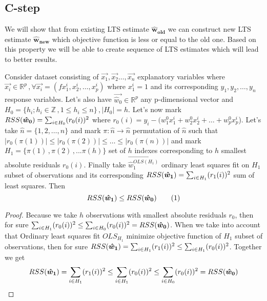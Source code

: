 
\subsection{C-step}
We will show that from existing LTS estimate $\boldsymbol{\hat{w}_{old}}$ we 
can construct new LTS estimate $\boldsymbol{\hat{w}_{new}}$ which objective 
function is less or equal to the old one. Based on this property we will be able 
to create sequence of LTS estimates which will lead to better results.




\begin{theorem}
Consider dataset consisting of
$\vec{x_1}, \vec{x_2} \ldots,\vec{x_n}$ explanatory variables where 
$\vec{x_i}\in\mathbb{R}^p\,, \forall \vec{x_i} = (fx^i_1, x^i_2,\ldots,x^i_p)$ where $x^i_1 = 1$
and its corresponding $y_1, y_2,\ldots,y_n$ response variables. 
Let's also have $\vec{\hat{w}_0}\in\mathbb{R}^p$ any p-dimensional vector and 
$H_0 = \{{h_i ; h_i \in\mathbb{Z}\,, 1 \leq h_i \leq n\}}\,, |H_0| = h$. 
Let's now mark $RSS(\boldsymbol{\hat{w}_0}) = \sum_{i\in H_0} (r_0(i))^2$ where 
$r_0(i) = y_i - (w_1^0x^i_1 + w_2^0x^i_2 +\ldots+ w_p^0x^i_p$).
Let's take $\hat{n} = \{{1,2,\ldots,n\}}$ and mark
$\pi: \hat{n} \rightarrow \hat{n}$ permutation of $\hat{n}$ such that $|r_0({\pi(1)})| \leq |r_0({\pi(2)})| \leq \ldots \leq |r_0({\pi(n)})|$
and mark $H_1 = \{{\pi(1)\,, \pi(2)\,,... \pi(h)\}}$ set of $h$ indexes corresponding to $h$ smallest absolute residuals $r_0(i)$.
Finally take $\vec{\hat{w}^{OLS(H_1)}_1 }$ ordinary least squares fit on $H_1$ subset of observations
and its corresponding $RSS(\boldsymbol{\hat{w}_1}) = \sum_{i\in H_1} (r_1(i))^2$ sum of least squares. Then
\[ 
	RSS(\what{1}) \leq RSS(\what{0}) \numberthis
\]
\end{theorem}

\begin{proof}
	Because we take $h$ observations with smallest absolute residuals $r_0$, then for sure $\sum_{i\in H_1} (r_0(i))^2 \leq \sum_{i\in H_0} (r_0(i))^2 =  RSS(\boldsymbol{\hat{w}_0})$.
	When we take into account that Ordinary least squares fit $OLS_{H_1}$ minimize objective function of 
	$H_1$ subset of observations, then for sure  $RSS(\boldsymbol{\hat{w}_1}) =  \sum_{i\in H_1} (r_1(i))^2 \leq \sum_{i\in H_1} (r_0(i))^2$.
	Together we get $$RSS(\boldsymbol{\hat{w}_1})=\sum_{i\in H_1}(r_1(i))^2\leq\sum_{i\in H_1}(r_0(i))^2\leq\sum_{i\in H_0}(r_0(i))^2=RSS(\boldsymbol{\hat{w}_0})$$
\end{proof}

